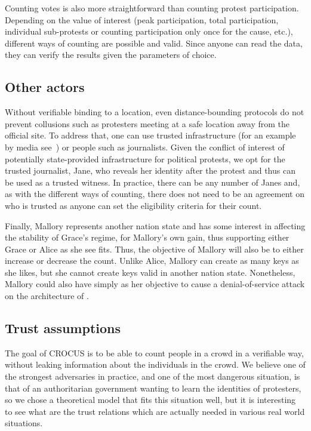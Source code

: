 Counting votes is also more straightforward than counting protest 
participation. Depending on the value of interest (\eg peak participation, 
total participation, individual sub-protests or counting participation only 
once for the cause, etc.), different ways of counting are
possible and valid. 
Since anyone can read the data, they can verify the results given the parameters of choice.

\subsection{Other actors}

Without verifiable binding to a location, even distance-bounding protocols do not prevent collusions such as protesters meeting at a safe location away from the official site. 
To address that, one can use trusted infrastructure (for an example by media see~\cite{LeMondeProtestingSolution}) or people such as journalists. 
Given the conflict of interest of potentially state-provided infrastructure for political protests, we opt for the trusted journalist, Jane, who reveals her identity after the protest and thus can be used as a trusted witness. 
In practice, there can be any number of  Janes and, as with the different ways of counting, there does not need to be an agreement on who is trusted as anyone can set the eligibility criteria for their count.

Finally, Mallory represents another nation state and has some interest in affecting the stability of Grace's regime, for Mallory's own gain, thus supporting either Grace or Alice as she see fits.  
Thus, the objective of Mallory will also be to either increase or decrease the count. 
Unlike Alice, Mallory can create as many keys as she likes, but she cannot create keys valid in another nation state. 
Nonetheless, Mallory could also have simply as her objective to cause a denial-of-service attack on the architecture of \CROCUS.


\subsection{Trust assumptions}

The goal of CROCUS is to be able to count people in a crowd in a verifiable way, without leaking information about the individuals in the crowd.
We believe one of the strongest adversaries in practice, and one of the most dangerous situation, is that of an authoritarian government wanting to learn the identities of protesters,
so we chose a theoretical model that fits this situation well, but it is interesting to see what are the trust relations which are actually needed in various real world situations.

